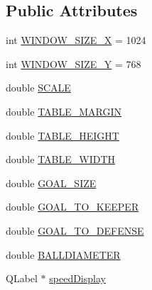 \subsection*{Public Attributes}
\begin{DoxyCompactItemize}
\item 
int \hyperlink{class_virtual_kicker_window_ac0dba6ae5e78a3c6bd80733352f3ff68}{W\+I\+N\+D\+O\+W\+\_\+\+S\+I\+Z\+E\+\_\+X} = 1024
\item 
int \hyperlink{class_virtual_kicker_window_aee668d4989faeb64811c2a30a386b8fb}{W\+I\+N\+D\+O\+W\+\_\+\+S\+I\+Z\+E\+\_\+Y} = 768
\item 
double \hyperlink{class_virtual_kicker_window_ad0e8e9ac08e95b33fc356c02ac61c448}{S\+C\+A\+LE}
\item 
double \hyperlink{class_virtual_kicker_window_a19166cf79aa1a3149bb939bd300c92ee}{T\+A\+B\+L\+E\+\_\+\+M\+A\+R\+G\+IN}
\item 
double \hyperlink{class_virtual_kicker_window_a6e8db84dbba68f917949ded5db04adf4}{T\+A\+B\+L\+E\+\_\+\+H\+E\+I\+G\+HT}
\item 
double \hyperlink{class_virtual_kicker_window_ad3d6551f437a1d0d68f9ef79368a24f1}{T\+A\+B\+L\+E\+\_\+\+W\+I\+D\+TH}
\item 
double \hyperlink{class_virtual_kicker_window_a8e22ef8383353b10f3a151f40cfa945b}{G\+O\+A\+L\+\_\+\+S\+I\+ZE}
\item 
double \hyperlink{class_virtual_kicker_window_a191e0cbda4319bcb1ad0b03701b7ba0c}{G\+O\+A\+L\+\_\+\+T\+O\+\_\+\+K\+E\+E\+P\+ER}
\item 
double \hyperlink{class_virtual_kicker_window_acd0a27752cb14965864976dfb6fcb537}{G\+O\+A\+L\+\_\+\+T\+O\+\_\+\+D\+E\+F\+E\+N\+SE}
\item 
double \hyperlink{class_virtual_kicker_window_ac908d7c6b620708113b23a346081f2d0}{B\+A\+L\+L\+D\+I\+A\+M\+E\+T\+ER}
\item 
Q\+Label $\ast$ \hyperlink{class_virtual_kicker_window_a7c57b0f6bcccf21edc523b6a52ce91da}{speed\+Display}
\end{DoxyCompactItemize}
